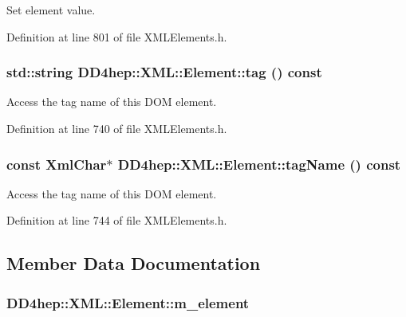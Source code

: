 Set element value. 

Definition at line 801 of file XMLElements.h.\hypertarget{class_d_d4hep_1_1_x_m_l_1_1_element_a2da8bfac1f2834e3cc5dd64dd7566a6e}{
\subsubsection[{tag}]{\setlength{\rightskip}{0pt plus 5cm}std::string DD4hep::XML::Element::tag () const}}
\label{class_d_d4hep_1_1_x_m_l_1_1_element_a2da8bfac1f2834e3cc5dd64dd7566a6e}


Access the tag name of this DOM element. 

Definition at line 740 of file XMLElements.h.\hypertarget{class_d_d4hep_1_1_x_m_l_1_1_element_ab1d76bcd1cbc41188317d0d6cdf9fd6b}{
\subsubsection[{tagName}]{\setlength{\rightskip}{0pt plus 5cm}const {\bf XmlChar}$\ast$ DD4hep::XML::Element::tagName () const}}
\label{class_d_d4hep_1_1_x_m_l_1_1_element_ab1d76bcd1cbc41188317d0d6cdf9fd6b}


Access the tag name of this DOM element. 

Definition at line 744 of file XMLElements.h.

\subsection{Member Data Documentation}
\hypertarget{class_d_d4hep_1_1_x_m_l_1_1_element_aa79a832ef142a29be556a3ec21c4e36d}{
\subsubsection[{m\_\-element}]{ {\bf DD4hep::XML::Element::m\_\-element}}}
\label{class_d_d4hep_1_1_x_m_l_1_1_element_aa79a832ef142a29be556a3ec21c4e36d}


